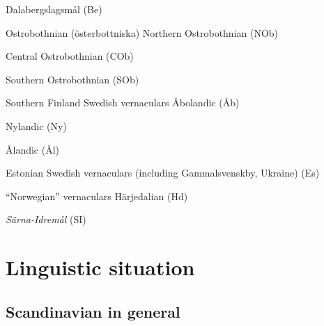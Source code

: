 Dalabergslagsmål (Be)  

\item 

Ostrobothnian (österbottniska)  Northern Ostrobothnian (NOb)

\item 

Central Ostrobothnian (COb)

\item 

Southern Ostrobothnian (SOb)

\item 

Southern Finland Swedish vernaculars  Åbolandic (Åb)

\item 

Nylandic (Ny)

\item 

Ålandic (Ål)


Estonian Swedish vernaculars (including Gammalsvenskby, Ukraine) (Es)  

\item 

“Norwegian” vernaculars  Härjedalian (Hd)

\item 

\textit{Särna-Idremål} (SI)

\section{ }

\section{ Linguistic situation}
\subsection{ Scandinavian in general}

